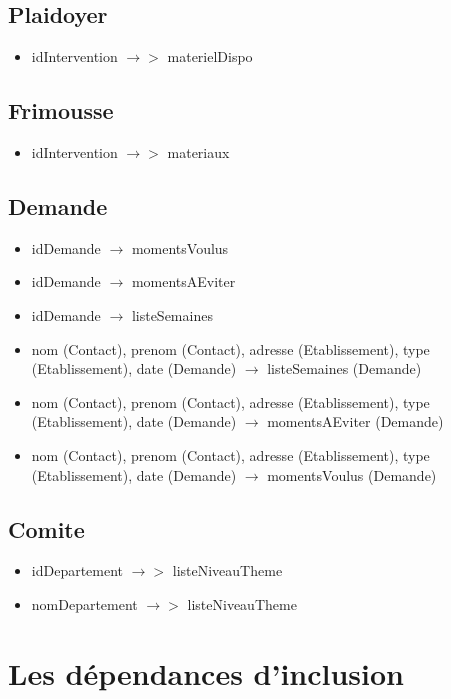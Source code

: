\documentclass[asi, sansVersion]{picInsa}
\begin{document}
\subsection*{Plaidoyer}
\begin{itemize}
\item[]	idIntervention $\rightarrow >$ materielDispo
\end{itemize}

\subsection*{Frimousse}
\begin{itemize}
\item[]	idIntervention $\rightarrow >$ materiaux
\end{itemize}

\subsection*{Demande}
\begin{itemize}
\item[] idDemande $\rightarrow$ momentsVoulus
\item[] idDemande $\rightarrow$ momentsAEviter
\item[] idDemande $\rightarrow$ listeSemaines
\item[] nom (Contact), prenom (Contact), adresse (Etablissement), type (Etablissement), date (Demande) $\rightarrow$ listeSemaines (Demande) 
\item[] nom (Contact), prenom (Contact), adresse (Etablissement), type (Etablissement), date (Demande) $\rightarrow$ momentsAEviter (Demande) 
\item[] nom (Contact), prenom (Contact), adresse (Etablissement), type (Etablissement), date (Demande) $\rightarrow$ momentsVoulus (Demande) 
\end{itemize}

\subsection*{Comite}
\begin{itemize}
\item[] idDepartement $\rightarrow >$ listeNiveauTheme
\item[] nomDepartement $\rightarrow >$ listeNiveauTheme
\end{itemize}

\section{Les dépendances d'inclusion}
\end{document}
